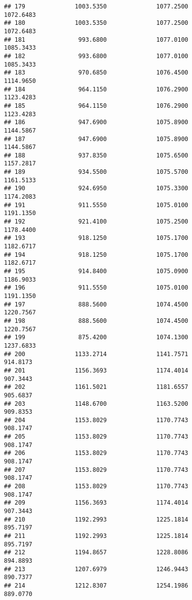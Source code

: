 \documentclass[]{article}
\begin{document}
\begin{verbatim}
## 179              1003.5350              1077.2500           1072.6483
## 180              1003.5350              1077.2500           1072.6483
## 181               993.6800              1077.0100           1085.3433
## 182               993.6800              1077.0100           1085.3433
## 183               970.6850              1076.4500           1114.9650
## 184               964.1150              1076.2900           1123.4283
## 185               964.1150              1076.2900           1123.4283
## 186               947.6900              1075.8900           1144.5867
## 187               947.6900              1075.8900           1144.5867
## 188               937.8350              1075.6500           1157.2817
## 189               934.5500              1075.5700           1161.5133
## 190               924.6950              1075.3300           1174.2083
## 191               911.5550              1075.0100           1191.1350
## 192               921.4100              1075.2500           1178.4400
## 193               918.1250              1075.1700           1182.6717
## 194               918.1250              1075.1700           1182.6717
## 195               914.8400              1075.0900           1186.9033
## 196               911.5550              1075.0100           1191.1350
## 197               888.5600              1074.4500           1220.7567
## 198               888.5600              1074.4500           1220.7567
## 199               875.4200              1074.1300           1237.6833
## 200              1133.2714              1141.7571            914.8173
## 201              1156.3693              1174.4014            907.3443
## 202              1161.5021              1181.6557            905.6837
## 203              1148.6700              1163.5200            909.8353
## 204              1153.8029              1170.7743            908.1747
## 205              1153.8029              1170.7743            908.1747
## 206              1153.8029              1170.7743            908.1747
## 207              1153.8029              1170.7743            908.1747
## 208              1153.8029              1170.7743            908.1747
## 209              1156.3693              1174.4014            907.3443
## 210              1192.2993              1225.1814            895.7197
## 211              1192.2993              1225.1814            895.7197
## 212              1194.8657              1228.8086            894.8893
## 213              1207.6979              1246.9443            890.7377
## 214              1212.8307              1254.1986            889.0770

\end{verbatim}
\end{document}
